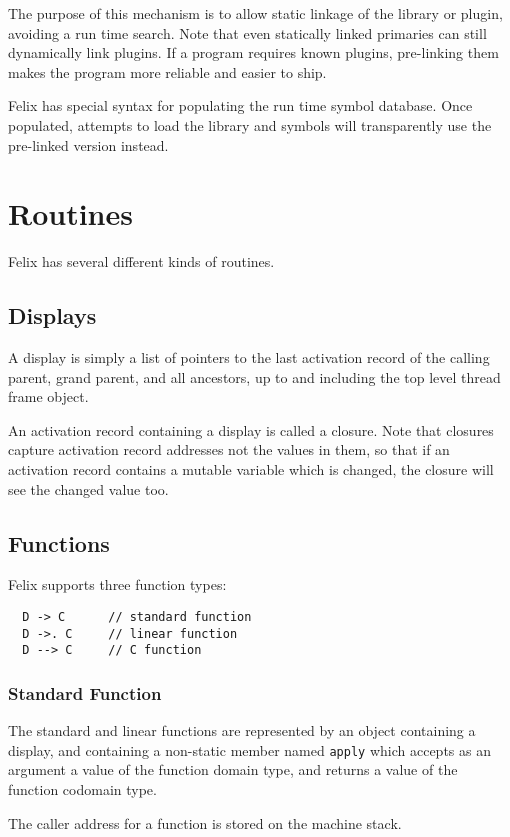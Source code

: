 \documentclass[oneside]{book}
\begin{document}
The purpose of this mechanism is to allow static linkage of
the library or plugin, avoiding a run time search.
Note that even statically linked primaries can still dynamically
link plugins. If a program requires known plugins, pre-linking
them makes the program more reliable and easier to ship.

Felix has special syntax for populating the run time symbol
database. Once populated, attempts to load the library and symbols
will transparently use the pre-linked version instead.

\chapter{Routines}
Felix has several different kinds of routines.

\section{Displays}
A display is simply a list of pointers to the last activation record of 
the calling parent, grand parent, and all ancestors, up to and including
the top level thread frame object.

An activation record containing a display is called a closure.
Note that closures capture activation record addresses not the
values in them, so that if an activation record contains a mutable
variable which is changed, the closure will see the changed value too.


\section{Functions}
Felix supports three function types:

\begin{verbatim}
  D -> C      // standard function
  D ->. C     // linear function
  D --> C     // C function
\end{verbatim}

\subsection{Standard Function}
The standard and linear functions are represented by an object containing a display,
and containing a non-static member named \verb$apply$ which accepts as an argument
a value of the function domain type, and returns a value of the function codomain type.

The caller address for a function is stored on the machine stack.
\end{document}
